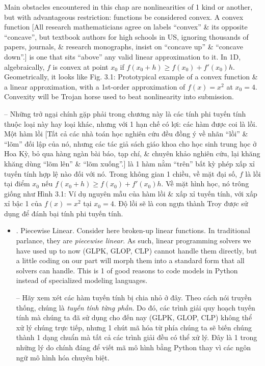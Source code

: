 \documentclass{article}
\begin{document}
\begin{itemize}
    Main obstacles encountered in this chap are nonlinearities of 1 kind or another, but with advantageous restriction: functions be considered convex. A convex function [All research mathematicians agree on labels ``convex'' \& its opposite ``concave'', but textbook authors for high schools in US, ignoring thousands of papers, journals, \& research monographs, insist on ``concave up'' \& ``concave down''.] is one that sits ``above'' any valid linear approximation to it. In 1D, algebraically, $f$ is convex at point $x_0$ if $f(x_0 + h)\ge f(x_0) + f'(x_0)h$. Geometrically, it looks like {\sf Fig. 3.1: Prototypical example of a convex function \& a linear approximation}, with a 1st-order approximation of $f(x) = x^2$ at $x_0 = 4$. Convexity will be Trojan horse used to beat nonlinearity into submission.

    -- Những trở ngại chính gặp phải trong chương này là các tính phi tuyến tính thuộc loại này hay loại khác, nhưng với 1 hạn chế có lợi: các hàm được coi là lồi. Một hàm lồi [Tất cả các nhà toán học nghiên cứu đều đồng ý về nhãn ``lồi'' \& ``lõm'' đối lập của nó, nhưng các tác giả sách giáo khoa cho học sinh trung học ở Hoa Kỳ, bỏ qua hàng ngàn bài báo, tạp chí, \& chuyên khảo nghiên cứu, lại khăng khăng dùng ``lõm lên'' \& ``lõm xuống''.] là 1 hàm nằm ``trên'' bất kỳ phép xấp xỉ tuyến tính hợp lệ nào đối với nó. Trong không gian 1 chiều, về mặt đại số, $f$ là lồi tại điểm $x_0$ nếu $f(x_0 + h)\ge f(x_0) + f'(x_0)h$. Về mặt hình học, nó trông giống như {\sf Hình 3.1: Ví dụ nguyên mẫu của hàm lồi \& xấp xỉ tuyến tính}, với xấp xỉ bậc 1 của $f(x) = x^2$ tại $x_0 = 4$. Độ lồi sẽ là con ngựa thành Troy được sử dụng để đánh bại tính phi tuyến tính.
    \begin{itemize}
        \item {. Piecewise Linear.} Consider here broken-up linear functions. In traditional parlance, they are {\it piecewise linear}. As such, linear programming solvers we have used up to now (GLPK, GLOP, CLP) cannot handle them directly, but a little coding on our part will morph them into a standard form that all solvers can handle. This is 1 of good reasons to code models in Python instead of specialized modeling languages.

        -- Hãy xem xét các hàm tuyến tính bị chia nhỏ ở đây. Theo cách nói truyền thống, chúng là {\it tuyến tính từng phần}. Do đó, các trình giải quy hoạch tuyến tính mà chúng ta đã sử dụng cho đến nay (GLPK, GLOP, CLP) không thể xử lý chúng trực tiếp, nhưng 1 chút mã hóa từ phía chúng ta sẽ biến chúng thành 1 dạng chuẩn mà tất cả các trình giải đều có thể xử lý. Đây là 1 trong những lý do chính đáng để viết mã mô hình bằng Python thay vì các ngôn ngữ mô hình hóa chuyên biệt.


\end{itemize}
\end{itemize}
\end{document}
